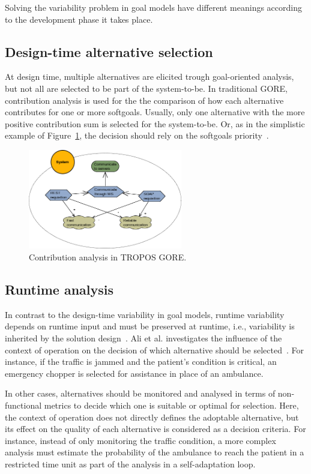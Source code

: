 Solving the variability problem in goal models have different meanings according to the development phase it takes place. 

\subsection{Design-time alternative selection}

At design time, multiple alternatives are elicited trough goal-oriented analysis, but not all are selected to be part of the system-to-be. In traditional GORE, contribution analysis is used for the the comparison of how each alternative contributes for one or more softgoals. Usually, only one alternative with the more positive contribution sum is selected for the system-to-be. Or, as in the simplistic example of Figure~\ref{fig:GORE_CA}, the decision should rely on the softgoals priority~\cite{Yu:2013}.

\begin{figure}[h!]
\centering
\includegraphics[width=0.6\textwidth]{imgs/GORE_CA.png}
\caption{Contribution analysis in TROPOS GORE.}
\label{fig:GORE_CA}
\end{figure}

\subsection{Runtime analysis}

In contrast to the design-time variability in goal models, runtime variability depends on runtime input and must be preserved at runtime, i.e., variability is inherited by the solution design~\cite{Yu:2008}. Ali et al. investigates the influence of the context of operation on the decision of which alternative should be selected~\cite{Ali:2010}. For instance, if the traffic is jammed and the patient's condition is critical, an emergency chopper is selected for assistance in place of an ambulance.

In other cases, alternatives should be monitored and analysed in terms of non-functional metrics to decide which one is suitable or optimal for selection. Here, the context of operation does not directly defines the adoptable alternative, but its effect on the quality of each alternative is considered as a decision criteria. For instance, instead of only monitoring the traffic condition, a more complex analysis must estimate the probability of the ambulance to reach the patient in a restricted time unit as part of the analysis in a self-adaptation loop. 



